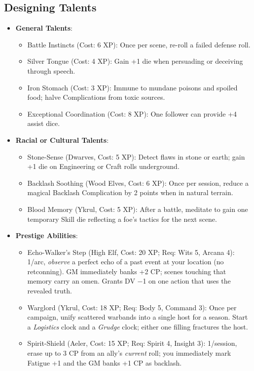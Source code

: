 \subsection*{Designing Talents}

\begin{itemize}
    \item \textbf{General Talents}:
    \begin{itemize}
        \item Battle Instincts (Cost: 6 XP): Once per scene, re-roll a failed defense roll.
        \item Silver Tongue (Cost: 4 XP): Gain +1 die when persuading or deceiving through speech.
        \item Iron Stomach (Cost: 3 XP): Immune to mundane poisons and spoiled food; halve Complications from toxic sources.
        \item Exceptional Coordination (Cost: 8 XP): One follower can provide +4 assist dice.
    \end{itemize}
    \item \textbf{Racial or Cultural Talents}:
    \begin{itemize}
        \item Stone-Sense (Dwarves, Cost: 5 XP): Detect flaws in stone or earth; gain +1 die on Engineering or Craft rolls underground.
        \item Backlash Soothing (Wood Elves, Cost: 6 XP): Once per session, reduce a magical Backlash Complication by 2 points when in natural terrain.
        \item Blood Memory (Ykrul, Cost: 5 XP): After a battle, meditate to gain one temporary Skill die reflecting a foe's tactics for the next scene.
    \end{itemize}
    \item \textbf{Prestige Abilities}:
    \begin{itemize}
        \item Echo-Walker's Step (High Elf, Cost: 20 XP; Req: Wits 5, Arcana 4): 
1/arc, \emph{observe} a perfect echo of a past event at your location (no retconning). 
GM immediately banks +2 CP; scenes touching that memory carry an omen. Grants DV −1 on one action that uses the revealed truth.
        \item Warglord (Ykrul, Cost: 18 XP; Req: Body 5, Command 3): 
Once per campaign, unify scattered warbands into a single host for a season. Start a \emph{Logistics} clock and a \emph{Grudge} clock; either one filling fractures the host.
        \item Spirit-Shield (Aeler, Cost: 15 XP; Req: Spirit 4, Insight 3): 
1/session, erase up to 3 CP from an ally's \emph{current} roll; you immediately mark Fatigue +1 and the GM banks +1 CP as backlash.
    \end{itemize}
\end{itemize}

